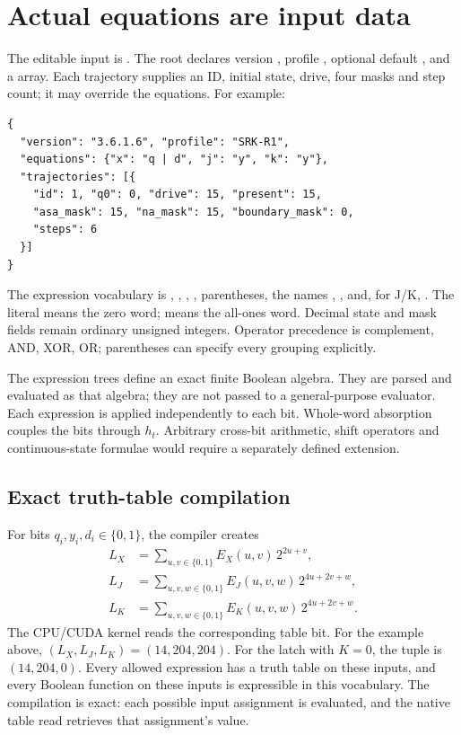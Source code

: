 \section{Actual equations are input data}
The editable input is . The root
declares version , profile , optional default
, and a  array. Each trajectory supplies an ID,
initial state, drive, four masks and step count; it may override the equations.
For example:
\begin{lstlisting}
{
  "version": "3.6.1.6", "profile": "SRK-R1",
  "equations": {"x": "q | d", "j": "y", "k": "y"},
  "trajectories": [{
    "id": 1, "q0": 0, "drive": 15, "present": 15,
    "asa_mask": 15, "na_mask": 15, "boundary_mask": 0,
    "steps": 6
  }]
}
\end{lstlisting}
The expression vocabulary is \code{\&}, \code{|}, \code{\textasciicircum}, \code{\textasciitilde},
parentheses, the names , , and, for J/K, . The literal
 means the zero word;  means the all-ones word. Decimal state and
mask fields remain ordinary unsigned integers. Operator precedence is complement,
AND, XOR, OR; parentheses can specify every grouping explicitly.

The expression trees define an exact finite Boolean algebra. They are parsed
and evaluated as that algebra; they are not passed to a general-purpose evaluator.
Each expression is applied independently to each bit. Whole-word absorption
couples the bits through $h_t$. Arbitrary cross-bit arithmetic, shift operators
and continuous-state formulae would require a separately defined extension.

\subsection{Exact truth-table compilation}
For bits $q_i,y_i,d_i\in\{0,1\}$, the compiler creates
\begin{align}
L_X &= \sum_{u,v\in\{0,1\}} E_X(u,v)\,2^{2u+v},\\
L_J &= \sum_{u,v,w\in\{0,1\}} E_J(u,v,w)\,2^{4u+2v+w},\\
L_K &= \sum_{u,v,w\in\{0,1\}} E_K(u,v,w)\,2^{4u+2v+w}.
\end{align}
The CPU/CUDA kernel reads the corresponding table bit. For the example above,
$(L_X,L_J,L_K)=(14,204,204)$. For the latch with $K=0$, the tuple is
$(14,204,0)$. Every allowed expression has a truth table on these inputs, and
every Boolean function on these inputs is expressible in this vocabulary.
The compilation is exact: each possible input assignment is evaluated, and the
native table read retrieves that assignment's value.
\clearpage

